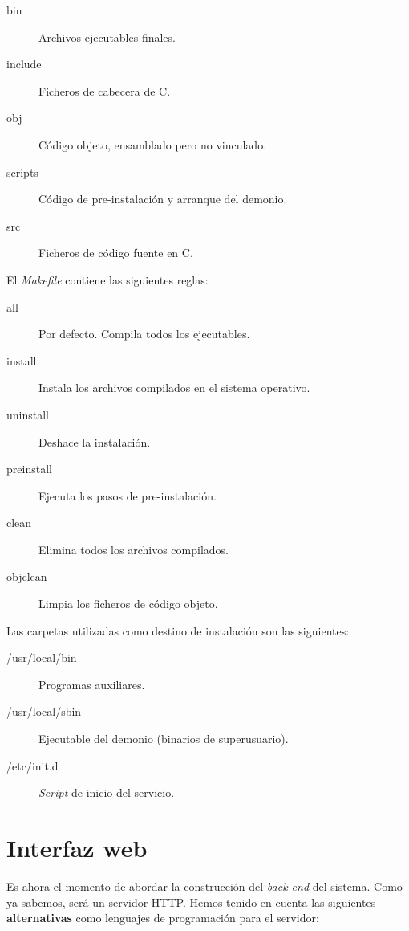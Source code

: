 \begin{description}
	\item[bin] Archivos ejecutables finales.
	\item[include] Ficheros de cabecera de C.
	\item[obj] Código objeto, ensamblado pero no vinculado.
	\item[scripts] Código de pre-instalación y arranque del demonio.
	\item[src] Ficheros de código fuente en C.
\end{description}

El \textit{Makefile} contiene las siguientes reglas:

\begin{description}
	\item[all] Por defecto. Compila todos los ejecutables.
	\item[install] Instala los archivos compilados en el sistema operativo.
	\item[uninstall] Deshace la instalación.
	\item[preinstall] Ejecuta los pasos de pre-instalación.
	\item[clean] Elimina todos los archivos compilados.
	\item[objclean] Limpia los ficheros de código objeto.
\end{description}

Las carpetas utilizadas como destino de instalación son las siguientes:

\begin{description}
	\item[/usr/local/bin] Programas auxiliares.
	\item[/usr/local/sbin] Ejecutable del demonio (binarios de superusuario).
	\item[/etc/init.d] \textit{Script} de inicio del servicio.
\end{description}

\newpage

\section{Interfaz web}

Es ahora el momento de abordar la construcción del \textit{back-end} del sistema. Como ya sabemos, será un servidor \acrshort{HTTP}. Hemos tenido en cuenta las siguientes \textbf{alternativas} como lenguajes de programación para el servidor:

